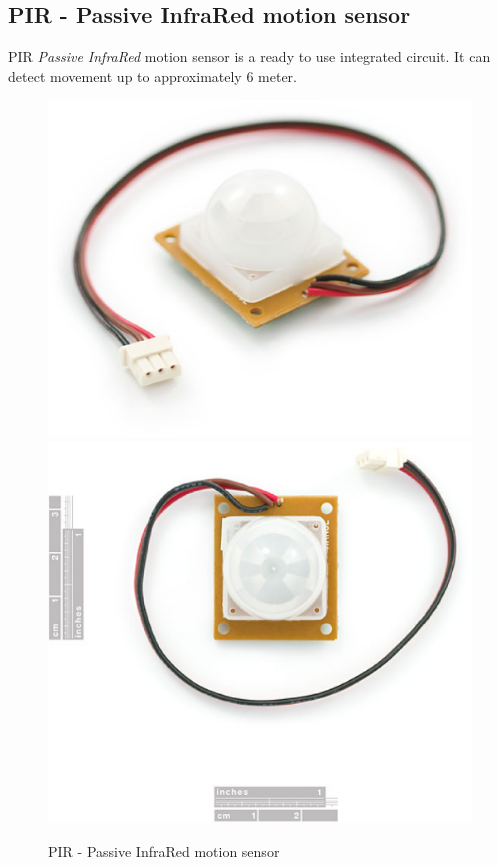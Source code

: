 \documentclass[12pt,a4paper]{report}
\begin{document}
\subsection{PIR - Passive InfraRed motion sensor}
PIR \textit{Passive InfraRed} motion sensor is a ready to use integrated circuit. It can detect movement up to approximately 6 meter.
\ \\
\begin{figure}[H]
\centering
\includegraphics*[scale=0.2]{pir}
\includegraphics*[scale=0.2]{pir_2}
\caption{PIR - Passive InfraRed motion sensor}
\end{figure}
\end{document}
